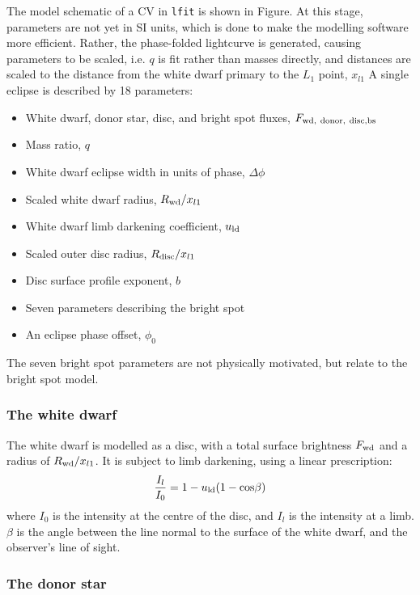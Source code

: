 The model schematic of a CV in \lstinline{lfit} is shown in Figure. At this stage, parameters are not yet in SI units, which is done to make the modelling software more efficient. Rather, the phase-folded lightcurve is generated, causing parameters to be scaled, i.e. $q$ is fit rather than masses directly, and distances are scaled to the distance from the white dwarf primary to the $L_1$ point, $x_{l1}$
A single eclipse is described by 18 parameters:
\begin{itemize}
    \item White dwarf, donor star, disc, and bright spot fluxes, $F_{\rm wd,\ donor,\ disc, bs}$
    \item Mass ratio, $q$
    \item White dwarf eclipse width in units of phase, $\Delta \phi$
    \item Scaled white dwarf radius, $R_{\rm wd} / x_{l1}$
    \item White dwarf limb darkening coefficient, $u_{\rm ld}$
    \item Scaled outer disc radius, $R_{\rm disc} / x_{l1}$
    \item Disc surface profile exponent, $b$
    \item Seven parameters describing the bright spot
    \item An eclipse phase offset, $\phi_0$
\end{itemize}
The seven bright spot parameters are not physically motivated, but relate to the bright spot model.

\subsubsection{The white dwarf}

The white dwarf is modelled as a disc, with a total surface brightness $F_{\rm wd}$ and a radius of $R_{\rm wd} / x_{l1}$. It is subject to limb darkening, using a linear prescription:
\begin{equation}
    \frac{I_l}{I_0} = 1 - u_{\rm ld}(1 - {\rm cos}\beta)
\end{equation}
where $I_0$ is the intensity at the centre of the disc, and $I_l$ is the intensity at a limb. $\beta$ is the angle between the line normal to the surface of the white dwarf, and the observer's line of sight.

\subsubsection{The donor star}

